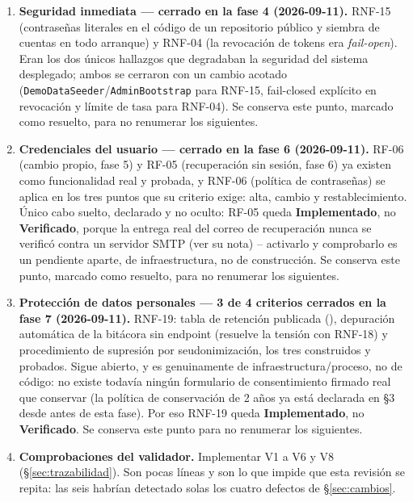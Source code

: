 \documentclass[11pt,a4paper]{article}
\DeclareRobustCommand{\cd}[1]{\texttt{\protect\seqsplit{#1}}}
\newcommand{\estadoV}{\textcolor{verdeok}{\textbf{Verificado}}}
\newcommand{\estadoI}{\textcolor{ambar}{\textbf{Implementado}}}
\begin{document}
\begin{enumerate}
    \item \textbf{Seguridad inmediata --- cerrado en la fase 4 (2026-09-11).} RNF-15
          (contraseñas literales en el código de un repositorio público y siembra de cuentas en
          todo arranque) y RNF-04 (la revocación de tokens era \emph{fail-open}). Eran los dos
          únicos hallazgos que degradaban la seguridad del sistema desplegado; ambos se cerraron
          con un cambio acotado (\texttt{DemoDataSeeder}/\texttt{AdminBootstrap} para RNF-15,
          fail-closed explícito en revocación y límite de tasa para RNF-04). Se conserva este
          punto, marcado como resuelto, para no renumerar los siguientes.
    \item \textbf{Credenciales del usuario --- cerrado en la fase 6 (2026-09-11).} RF-06
          (cambio propio, fase 5) y RF-05 (recuperación sin sesión, fase 6) ya existen como
          funcionalidad real y probada, y RNF-06 (política de contraseñas) se aplica en los tres
          puntos que su criterio exige: alta, cambio y restablecimiento. Único cabo suelto,
          declarado y no oculto: RF-05 queda \estadoI{}, no \estadoV{}, porque la entrega real
          del correo de recuperación nunca se verificó contra un servidor SMTP (ver su nota) --
          activarlo y comprobarlo es un pendiente aparte, de infraestructura, no de
          construcción. Se conserva este punto, marcado como resuelto, para no renumerar los
          siguientes.
    \item \textbf{Protección de datos personales --- 3 de 4 criterios cerrados en la fase 7
          (2026-09-11).} RNF-19: tabla de retención publicada
          (\cd{docs/etica/RETENCION-DATOS.md}), depuración automática de la bitácora sin
          endpoint (resuelve la tensión con RNF-18) y procedimiento de supresión por
          seudonimización, los tres construidos y probados. Sigue abierto, y es genuinamente de
          infraestructura/proceso, no de código: no existe todavía ningún formulario de
          consentimiento firmado real que conservar (la política de conservación de 2 años ya
          está declarada en \cd{ETHICS.md} \S3 desde antes de esta fase). Por eso RNF-19 queda
          \estadoI{}, no \estadoV{}. Se conserva este punto para no renumerar los siguientes.
    \item \textbf{Comprobaciones del validador.} Implementar V1 a V6 y V8
          (\S\ref{sec:trazabilidad}). Son pocas líneas y son lo que impide que esta revisión se
          repita: las seis habrían detectado solas los cuatro defectos de \S\ref{sec:cambios}.

\end{enumerate}
\end{document}
